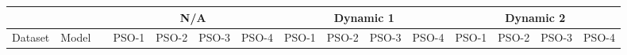 \documentclass[fleqn,10pt]{wlscirep}
\begin{document}
\begin{table}[htb]
{\begin{tabular}{lll|clll|clllllll|}
                                                    &                                                                                                          &     & \multicolumn{4}{c|}{N/A}                                                                                                                                                                                                                                                                                          & \multicolumn{4}{c|}{Dynamic 1}                                                                                                                                                                                                                                                                                    & \multicolumn{4}{c|}{Dynamic 2}                                                                                                                                                                                                                                                                                    \\ \hline
\multicolumn{1}{|l|}{Dataset}                       & \multicolumn{1}{l|}{Model}                                                                               &     & \multicolumn{1}{c|}{PSO-1}                                                 & \multicolumn{1}{c|}{PSO-2}                                                 & \multicolumn{1}{c|}{PSO-3}                                                 & \multicolumn{1}{c|}{PSO-4}                                                 & \multicolumn{1}{c|}{PSO-1}                                                 & \multicolumn{1}{c|}{PSO-2}                                                 & \multicolumn{1}{c|}{PSO-3}                                                 & \multicolumn{1}{c|}{PSO-4}                                                 & \multicolumn{1}{c|}{PSO-1}                                                 & \multicolumn{1}{c|}{PSO-2}                                                 & \multicolumn{1}{c|}{PSO-3}                                                 & \multicolumn{1}{c|}{PSO-4}                                                 \\ \hline

\end{tabular}}
\end{table}
\end{document}
